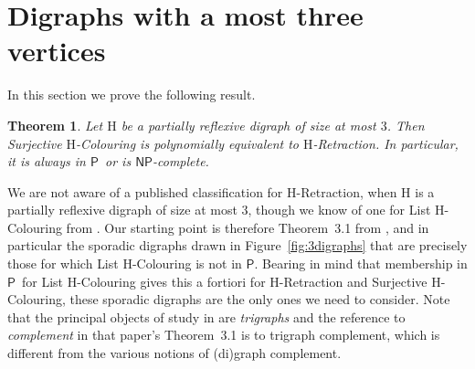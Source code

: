 \documentclass[a4paper,12pt]{article}
\newtheorem{theorem}{Theorem}
\theoremstyle{remark}
\newcommand{\NP}[0]{\ensuremath{\mathsf{NP}}}
\newcommand{\Ptime}[0]{\ensuremath{\mathsf{P}}}
\renewcommand{\H}{\ensuremath{\mathrm{H}}}
\begin{document}
\section{Digraphs with a most three vertices}

In this section we prove the following result.
\begin{theorem}
Let $\H$ be a partially reflexive digraph of size at most $3$. Then {\sc Surjective $\H$-Colouring} is polynomially equivalent to {\sc $\H$-Retraction}. In particular, it is always in \Ptime\ or is \NP-complete.
\label{thm:3digraph}
\end{theorem}


We are not aware of a published classification for {\sc $\H$-Retraction}, when $\H$ is a partially reflexive digraph of size at most $3$, though we know of one for {\sc List $\H$-Colouring} from \cite{FederHellTucker}. Our starting point is therefore 
Theorem~3.1 from \cite{FederHellTucker}, and in particular the sporadic digraphs drawn in Figure~\ref{fig:3digraphs} that are precisely those for which {\sc List $\H$-Colouring} is not in \Ptime. Bearing in mind that membership in \Ptime\ for {\sc List $\H$-Colouring} gives this a fortiori for {\sc $\H$-Retraction} and {\sc Surjective $\H$-Colouring}, these sporadic digraphs are the only ones we need to consider. Note that the principal objects of study in \cite{FederHellTucker} are \emph{trigraphs} and the reference to \emph{complement} in that paper's Theorem~3.1 is to trigraph complement, which is different from the various notions of (di)graph complement.
\end{document}
